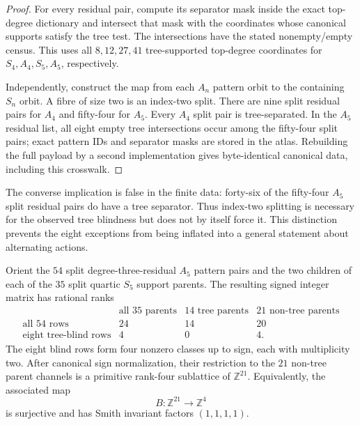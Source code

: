 \begin{proof}
For every residual pair, compute its separator mask inside the exact
top-degree dictionary and intersect that mask with the coordinates whose
canonical supports satisfy the tree test.  The intersections have the stated
nonempty/empty census.  This uses all $8,12,27,41$ tree-supported top-degree
coordinates for $S_4,A_4,S_5,A_5$, respectively.

Independently, construct the map from each $A_n$ pattern orbit to the
containing $S_n$ orbit.  A fibre of size two is an index-two split.  There are
nine split residual pairs for $A_4$ and fifty-four for $A_5$.  Every $A_4$
split pair is tree-separated.  In the $A_5$ residual list, all eight empty
tree intersections occur among the fifty-four split pairs; exact pattern IDs
and separator masks are stored in the atlas.  Rebuilding the full payload by
a second implementation gives byte-identical canonical data, including this
crosswalk.
\end{proof}



The converse implication is false in the finite data: forty-six of the
fifty-four $A_5$ split residual pairs do have a tree separator.  Thus
index-two splitting is necessary for the observed tree blindness but does not
by itself force it.  This distinction prevents the eight exceptions from
being inflated into a general statement about alternating actions.

\begin{proposition}
\label{prop:a5-signed-blind-core}
Orient the $54$ split degree-three-residual $A_5$ pattern pairs and the two
children of each of the $35$ split quartic $S_5$ support parents.  The
resulting signed integer matrix has rational ranks
\[
\begin{array}{c|ccc}
 & \text{all 35 parents} & \text{14 tree parents} &
   \text{21 non-tree parents}\\ \hline
\text{all 54 rows} & 24&14&20\\
\text{eight tree-blind rows} & 4&0&4.
\end{array}
\]
The eight blind rows form four nonzero classes up to sign, each with
multiplicity two.  After canonical sign normalization, their restriction to
the $21$ non-tree parent channels is a primitive rank-four sublattice of
$\mathbb Z^{21}$.  Equivalently, the associated map
\[
  B\colon\mathbb Z^{21}\longrightarrow\mathbb Z^4
\]
is surjective and has Smith invariant factors $(1,1,1,1)$.
\end{proposition}

